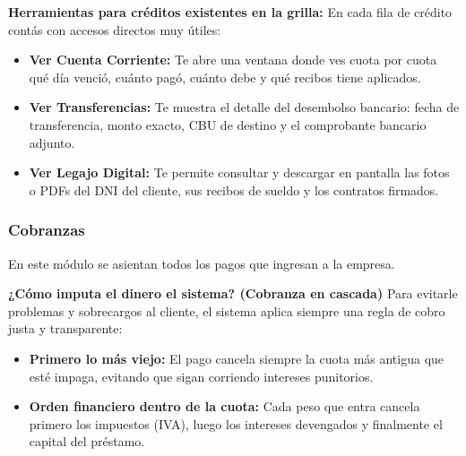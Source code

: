 \documentclass[12pt,a4paper]{article}
\renewcommand{\_}{\textunderscore\allowbreak}
\begin{document}
\textbf{Herramientas para créditos existentes en la grilla:}
En cada fila de crédito contás con accesos directos muy útiles:
\begin{itemize}
    \item \textbf{Ver Cuenta Corriente:} Te abre una ventana donde ves cuota por cuota qué día venció, cuánto pagó, cuánto debe y qué recibos tiene aplicados.
    \item \textbf{Ver Transferencias:} Te muestra el detalle del desembolso bancario: fecha de transferencia, monto exacto, CBU de destino y el comprobante bancario adjunto.
    \item \textbf{Ver Legajo Digital:} Te permite consultar y descargar en pantalla las fotos o PDFs del DNI del cliente, sus recibos de sueldo y los contratos firmados.
\end{itemize}

\subsubsection{Cobranzas}
En este módulo se asientan todos los pagos que ingresan a la empresa. 

\textbf{¿Cómo imputa el dinero el sistema? (Cobranza en cascada)}
Para evitarle problemas y sobrecargos al cliente, el sistema aplica siempre una regla de cobro justa y transparente:
\begin{itemize}
    \item \textbf{Primero lo más viejo:} El pago cancela siempre la cuota más antigua que esté impaga, evitando que sigan corriendo intereses punitorios.
    \item \textbf{Orden financiero dentro de la cuota:} Cada peso que entra cancela primero los impuestos (IVA), luego los intereses devengados y finalmente el capital del préstamo.
\end{itemize}
\end{document}
